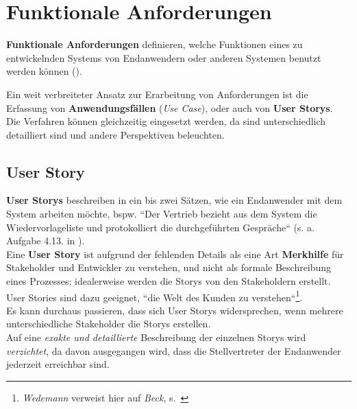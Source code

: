 \section{Funktionale Anforderungen}

\vspace{5mm}
\begin{tcolorbox}
    \textbf{Funktionale Anforderungen} definieren, welche Funktionen eines zu entwickelnden Systems von Endanwendern oder anderen Systemen benutzt werden können (\cite[66]{Wed09}).
\end{tcolorbox}
\vspace{5mm}

\noindent
Ein weit verbreiteter Ansatz zur Erarbeitung von Anforderungen ist die Erfassung von \textbf{Anwendungsfällen} (\textit{Use Case}), oder auch von \textbf{User Storys}.\\

\noindent
Die Verfahren können gleichzeitig eingesetzt werden, da sind unterschiedlich detailliert sind und andere Perspektiven beleuchten.

\subsection*{User Story}

\textbf{User Storys} beschreiben in ein bis zwei Sätzen, wie ein Endanwender mit dem System arbeiten möchte, bspw. ``Der Vertrieb bezieht aus dem System die Wiedervorlageliste und protokolliert die durchgeführten Gespräche`` (s. a. Aufgabe 4.13. in \cite{Wed09}).\\

\noindent
Eine \textbf{User Story} ist aufgrund der fehlenden Details als eine Art \textbf{Merkhilfe} für Stakeholder und Entwickler zu verstehen, und nicht als formale Beschreibung eines Prozesses; idealerweise werden die Storys von den Stakeholdern erstellt.\\

\noindent
User Stories sind dazu geeignet, ``die Welt des Kunden zu verstehen``\footnote{
\textit{Wedemann} verweist hier auf \textit{Beck}, s.~\cite[66]{Wed09}
}.\\

\noindent
Es kann durchaus passieren, dass sich User Storys widersprechen, wenn mehrere unterschiedliche Stakeholder die Storys erstellen.\\

\noindent
Auf eine \textit{exakte und detaillierte} Beschreibung der einzelnen Storys wird \textit{verzichtet}, da davon ausgegangen wird, dass die Stellvertreter der Endanwender jederzeit erreichbar sind.\\

